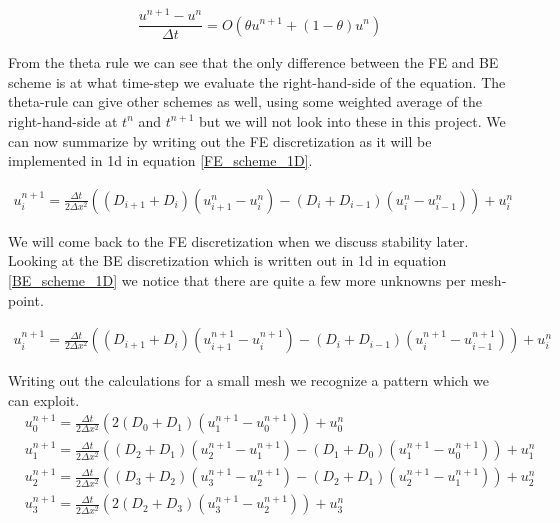\begin{equation}\label{theta_rule}
 \frac{u^{n+1}-u^n}{\Delta t} = O\left(\theta u^{n+1} +(1-\theta)u^n\right)
\end{equation}

From the theta rule we can see that the only difference between the FE and BE scheme is at what time-step we evaluate the right-hand-side of the equation. 
The theta-rule can give other schemes as well, using some weighted average of the right-hand-side at $t^n$ and $t^{n+1}$ but we will not look into these in this project. 
We can now summarize by writing out the FE discretization as it will be implemented in 1d in equation \ref{FE_scheme_1D}.

\begin{align}\label{FE_scheme_1D}
 u^{n+1}_i = \frac{\Delta t}{2\Delta x^2}\left((D_{i+1}+D_{i})(u^n_{i+1}-u^n_{i})-(D_{i}+D_{i-1})(u^n_{i}-u^n_{i-1})\right) + u^n_i
\end{align}

We will come back to the FE discretization when we discuss stability later. \\
Looking at the BE discretization which is written out in 1d in equation \ref{BE_scheme_1D} we notice that there are quite a few more unknowns per mesh-point. 

\begin{align}\label{BE_scheme_1D}
 u^{n+1}_i = \frac{\Delta t}{2\Delta x^2}\left((D_{i+1}+D_{i})(u^{n+1}_{i+1}-u^{n+1}_{i})-(D_{i}+D_{i-1})(u^{n+1}_{i}-u^{n+1}_{i-1})\right) + u^n_i
\end{align}

Writing out the calculations for a small mesh we recognize a pattern which we can exploit.
\begin{align*}
 &u^{n+1}_0 =  \frac{\Delta t}{2\Delta x^2}\left(2(D_{0}+D_{1})(u^{n+1}_{1}-u^{n+1}_{0})\right) + u^n_0\\
 &u^{n+1}_1 = \frac{\Delta t}{2\Delta x^2}\left((D_{2}+D_{1})(u^{n+1}_{2}-u^{n+1}_{1})-(D_{1}+D_{0})(u^{n+1}_{1}-u^{n+1}_{0})\right) + u^n_1\\
 &u^{n+1}_2 = \frac{\Delta t}{2\Delta x^2}\left((D_{3}+D_{2})(u^{n+1}_{3}-u^{n+1}_{2})-(D_{2}+D_{1})(u^{n+1}_{2}-u^{n+1}_{1})\right) + u^n_2 \\
 &u^{n+1}_3 =  \frac{\Delta t}{2\Delta x^2}\left(2(D_{2}+D_{3})(u^{n+1}_{3}-u^{n+1}_{2})\right) + u^n_3
\end{align*}

